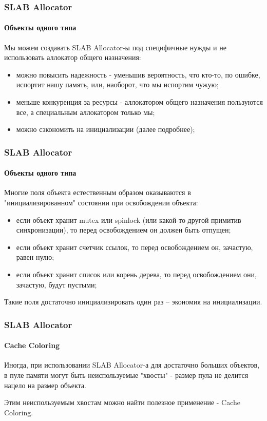 \begin{frame}
\frametitle{SLAB Allocator}
\framesubtitle{Объекты одного типа}

Мы можем создавать SLAB Allocator-ы под специфичные нужды и не использовать аллокатор общего назначения:
\begin{itemize}
  \item можно повысить надежность - уменьшив вероятность, что кто-то, по ошибке, испортит нашу память, или, наоборот, что мы испортим чужую;
  \item меньше конкуренция за ресурсы - аллокатором общего назначения пользуются все, а специальным аллокатором только мы;
  \item можно сэкономить на инициализации (далее подробнее);
\end{itemize}
\end{frame}

\begin{frame}
\frametitle{SLAB Allocator}
\framesubtitle{Объекты одного типа}

Многие поля объекта естественным образом оказываются в "инициализированном" состоянии при освобождении объекта:

\begin{itemize}
  \item если объект хранит mutex или spinlock (или какой-то другой примитив синхронизации), то перед освобождением он должен быть отпущен;
  \item если объект хранит счетчик ссылок, то перед освобождением он, зачастую, равен нулю;
  \item если объект хранит список или корень дерева, то перед освобождением они, зачастую, будут пустыми;
\end{itemize}

Такие поля достаточно инициализировать один раз -- экономия на инициализации.

\end{frame}

\begin{frame}
\frametitle{SLAB Allocator}
\framesubtitle{Cache Coloring}

Иногда, при использовании SLAB Allocator-а для достаточно больших объектов, в пуле памяти могут быть неиспользуемые "хвосты" - размер пула не делится нацело на размер объекта.

Этим неиспользуемым хвостам можно найти полезное применение - Cache Coloring.

\end{frame}

